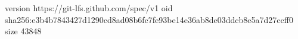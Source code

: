 version https://git-lfs.github.com/spec/v1
oid sha256:e3b4b7843427d1290cd8ad08b6fc7fe93be14e36ab8de03ddcb8e5a7d27ccff0
size 43848
